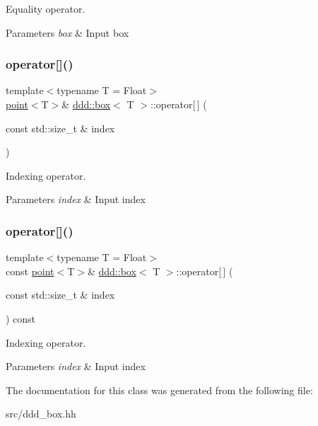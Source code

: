 Equality operator. 


\begin{DoxyParams}{Parameters}
{\em box} & Input box \\
\hline
\end{DoxyParams}
\mbox{\label{classddd_1_1box_a3fd2b2f0fbfcc484878a32f82994b294}} 
\subsubsection{\texorpdfstring{operator[]()}{operator[]()}\hspace{0.1cm}{\footnotesize\ttfamily [1/2]}}
{\footnotesize\ttfamily template$<$typename T = Float$>$ \\
\hyperlink{classddd_1_1point}{point}$<$T$>$\& \hyperlink{classddd_1_1box}{ddd\+::box}$<$ T $>$\+::operator\mbox{[}$\,$\mbox{]} (\begin{DoxyParamCaption}\item[{const std\+::size\+\_\+t \&}]{index }\end{DoxyParamCaption})\hspace{0.3cm}{\ttfamily [inline]}}



Indexing operator. 


\begin{DoxyParams}{Parameters}
{\em index} & Input index \\
\hline
\end{DoxyParams}
\mbox{\label{classddd_1_1box_af9045901479a5032acaf916009c4731d}} 
\subsubsection{\texorpdfstring{operator[]()}{operator[]()}\hspace{0.1cm}{\footnotesize\ttfamily [2/2]}}
{\footnotesize\ttfamily template$<$typename T = Float$>$ \\
const \hyperlink{classddd_1_1point}{point}$<$T$>$\& \hyperlink{classddd_1_1box}{ddd\+::box}$<$ T $>$\+::operator\mbox{[}$\,$\mbox{]} (\begin{DoxyParamCaption}\item[{const std\+::size\+\_\+t \&}]{index }\end{DoxyParamCaption}) const\hspace{0.3cm}{\ttfamily [inline]}}



Indexing operator. 


\begin{DoxyParams}{Parameters}
{\em index} & Input index \\
\hline
\end{DoxyParams}


The documentation for this class was generated from the following file\+:\begin{DoxyCompactItemize}
\item 
src/ddd\+\_\+box.\+hh\end{DoxyCompactItemize}
